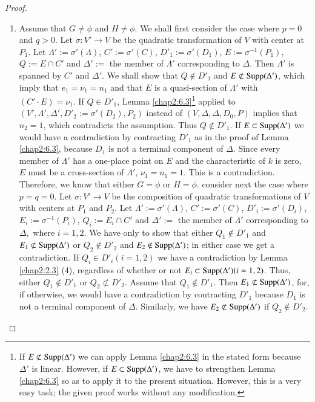 \begin{proof}
\begin{enumerate}
\item Assume that $G\neq \phi$ and $H\neq \phi$. We shall first
  consider the case where $p=0$ and $q>0$. Let $\sigma:V'\to V$ be the
  quadratic transformation of $V$ with center at $P_{1}$. Let
  $\Lambda':=\sigma'(\Lambda)$, $C':=\sigma'(C)$,
  $D'_{1}:=\sigma'(D_{1})$, $E:=\sigma^{-1}(P_{1})$, $Q:=E\cap C'$ and
  $\Delta':=$ the member of $\Lambda'$ corresponding to $\Delta$. Then
  $\Lambda'$ is spanned by $C'$ and $\Delta'$. We shall show that
  $Q\not\in D'_{1}$ and $E\nsubset \Supp(\Delta')$, which imply that
  $e_{1}=\nu_{1}=n_{1}$ and that $E$ is a quasi-section of $\Lambda'$
  with $(C'\cdot E)=\nu_{1}$. If $Q\in D'_{1}$, Lemma
  \ref{chap2:6.3}\footnote{If $E\nsubset \Supp(\Delta')$ we can apply
    Lemma \ref{chap2:6.3} in the stated form because $\Delta'$ is
    linear. However, if $E\subset \operatorname{Supp}(\Delta')$, we have to
    strengthen Lemma \ref{chap2:6.3} so as to apply it to the present
    situation. However, this is a very easy task; the given proof
    works without any modification.} applied to
  $(V',\Lambda',\Delta',D'_{2}:=\sigma'(D_{2}),P_{2})$ instead of
  $(V,\Delta,\Delta,D_{0},P)$ implies that $n_{2}=1$, which
  contradicts the assumption. Thus $Q\not\in D'_{1}$. If $E\subset
  \operatorname{Supp}(\Delta')$ we would have a contradiction by contracting
  $D'_{1}$ as in the proof of Lemma \ref{chap2:6.3}, because $D_{1}$ is
  not a terminal component of $\Delta$. Since every member of
  $\Lambda'$ has a one-place point on $E$ and the characteristic of
  $k$ is zero, $E$ must be a cross-section of $\Lambda'$, \iec
  $\nu_{1}=n_{1}=1$. This is a contradiction. Therefore, we know that
  either $G=\phi$ or $H=\phi$. consider next the case where
  $p=q=0$. Let $\sigma:V'\to V$ be the composition of quadratic
  transformations of $V$ with centers at $P_{1}$ and $P_{2}$. Let
  $\Lambda':=\sigma'(\Lambda)$, $C':=\sigma'(C)$,
  $D'_{i}:=\sigma'(D_{i})$, $E_{i}:=\sigma^{-1}(P_{i})$,
  $Q_{i}:=E_{i}\cap C'$ and $\Delta':=$ the member of $\Lambda'$
  corresponding to $\Delta$,\pageoriginale\ where $i=1,2$. We have only
  to show that either $Q_{1}\not\in D'_{1}$ and $E_{1}\not\subset
  \operatorname{Supp}(\Delta')$ or $Q_{2}\not\in D'_{2}$ and $E_{2}\not\in
  \operatorname{Supp}(\Delta')$; in either case we get a contradiction. If $Q_{i}\in
  D'_{i}(i=1,2)$ we have a contradiction by Lemma \ref{chap2:2.3} (4),
  regardless of whether or not $E_{i}\subset
  \operatorname{Supp}(\Delta')(i=1,2)$. Thus, either $Q_{1}\not\in D'_{1}$ or
  $Q_{2}\not\subset D'_{2}$. Assume that $Q_{1}\not\in D'_{1}$. Then
  $E_{1}\not\subset \operatorname{Supp}(\Delta')$, for, if otherwise, we would have
  a contradiction by contracting $D'_{1}$ because $D_{1}$ is not a
  terminal component of $\Delta$. Similarly, we have $E_{2}\not\subset
  \operatorname{Supp}(\Delta')$ if $Q_{2}\not\in D'_{2}$.
\end{enumerate}
\end{proof}

